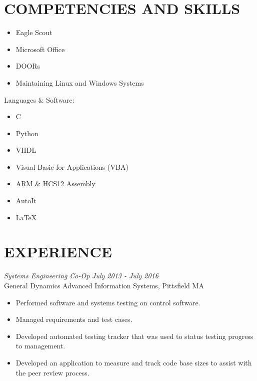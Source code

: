 \documentclass[line,margin]{res}
\begin{document}
\begin{resume}
\section{COMPETENCIES AND SKILLS} 
		\begin{multicols}{2}
			\begin{itemize}
				\itemsep -2pt
				\item[] Eagle Scout
				\item[] Microsoft Office
				\item[] DOORs
				\item[] Maintaining Linux and Windows Systems

			\end{itemize}
		\end{multicols}
	\vspace{-10pt}
	{Languages \& Software:} %
		\begin{multicols}{2}
			\begin{itemize}
				\itemsep -2pt
				\item[] C
				\item[] Python
				\item[] VHDL
				\item[] Visual Basic for Applications (VBA)
				\item[] ARM \& HCS12 Assembly
				\item[] AutoIt
				\item[] \LaTeX 
			\end{itemize}
		\end{multicols}
\section{EXPERIENCE} 
{\sl Systems Engineering Co-Op} \hfill {\sl July 2013 - July 2016 }\\
	General Dynamics Advanced Information Systems, Pittsfield MA
	\begin{itemize}  \itemsep -2pt %
			\item Performed software and systems testing on 
				control software. 
			\item Managed requirements and test cases.
			\item Developed automated testing tracker
				that was used to status testing progress
				to management. 
			\item Developed an application to measure and track 
				code base sizes to assist with the peer review process.
	\end{itemize}
 

\end{resume}
\end{document}
